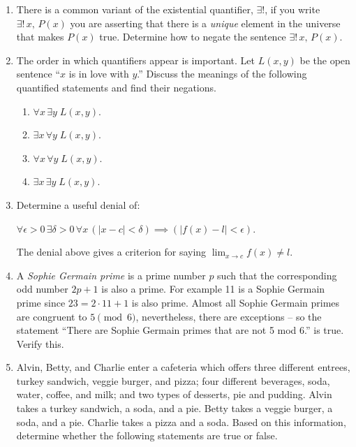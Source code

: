 \begin{enumerate}
\item There is a common variant of the existential quantifier,
$\exists !$, if you write $\exists ! \, x, \, P(x)$ you are asserting 
that there is a \emph{unique} element 
in the universe that makes $P(x)$ true.
Determine how to negate the sentence $\exists ! \, x, \, P(x)$.

\item The order in which quantifiers appear is important.  Let $L(x,y)$
be the open sentence ``$x$ is in love with $y$.''  Discuss the meanings of the
following quantified statements and find their negations.

\begin{enumerate}
\item $\forall x \, \exists y \; L(x,y)$.
\item $\exists x \, \forall y \; L(x, y)$.
\item $\forall x \, \forall y \; L(x, y)$.
\item $\exists x \, \exists y \; L(x, y)$.
\end{enumerate}

\item Determine a useful denial of: 

$\displaystyle \forall \epsilon>0 \, \exists 
\delta>0 \, \forall x \, (|x-c| < \delta) \implies (|f(x)-l| < \epsilon) $.

The denial above gives a criterion for saying $\lim_{x\rightarrow c}f(x) \neq l.$

\item A  \emph{Sophie Germain prime} is a prime number $p$
such that the corresponding odd number $2p+1$ is also a prime.  For example 11 is a 
Sophie Germain prime since $23 = 2\cdot 11 + 1$ is also prime.  Almost all Sophie Germain
primes are congruent to $5 \pmod{6}$, nevertheless, there are exceptions -- so the
statement ``There are Sophie Germain primes that are not 5 mod 6.'' is true.  Verify this.

\item  Alvin, Betty, and Charlie enter a cafeteria which offers three different
entrees, turkey sandwich, veggie burger, and pizza; four different
beverages, soda, water, coffee, and milk; and two types of desserts,
pie and pudding. Alvin takes a turkey sandwich, a soda, and a pie.
Betty takes a veggie burger, a soda, and a pie. Charlie takes a pizza
and a soda. Based on this information, determine whether the following
statements are true or false.


\end{enumerate}

